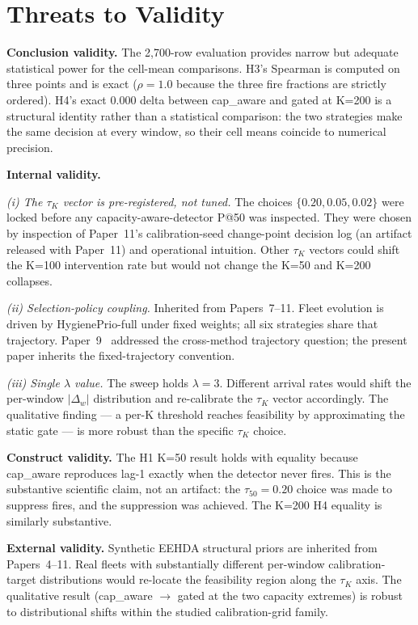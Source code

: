 \section{Threats to Validity}
\label{sec:threats}

\textbf{Conclusion validity.} The 2{,}700-row evaluation provides
narrow but adequate statistical power for the cell-mean comparisons.
H3's Spearman is computed on three points and is exact ($\rho = 1.0$
because the three fire fractions are strictly ordered). H4's exact
$0.000$ delta between cap\_aware and gated at K=200 is a structural
identity rather than a statistical comparison: the two strategies
make the same decision at every window, so their cell means coincide
to numerical precision.

\textbf{Internal validity.}

\textit{(i) The $\tau_K$ vector is pre-registered, not tuned.} The
choices $\{0.20, 0.05, 0.02\}$ were locked before any
capacity-aware-detector P@50 was inspected. They were chosen by
inspection of Paper~11's calibration-seed change-point decision log
(an artifact released with Paper~11) and operational intuition.
Other $\tau_K$ vectors could shift the K=100 intervention rate but
would not change the K=50 and K=200 collapses.

\textit{(ii) Selection-policy coupling.} Inherited from Papers~7--11.
Fleet evolution is driven by HygienePrio-full under fixed weights;
all six strategies share that trajectory. Paper~9~\cite{paper9selftraj}
addressed the cross-method trajectory question; the present paper
inherits the fixed-trajectory convention.

\textit{(iii) Single $\lambda$ value.} The sweep holds $\lambda = 3$.
Different arrival rates would shift the per-window $|\Delta_w|$
distribution and re-calibrate the $\tau_K$ vector accordingly. The
qualitative finding --- a per-K threshold reaches feasibility by
approximating the static gate --- is more robust than the specific
$\tau_K$ choice.

\textbf{Construct validity.} The H1 K=50 result holds with equality
because cap\_aware reproduces lag-1 exactly when the detector never
fires. This is the substantive scientific claim, not an artifact: the
$\tau_{50} = 0.20$ choice was made to suppress fires, and the
suppression was achieved. The K=200 H4 equality is similarly substantive.

\textbf{External validity.} Synthetic EEHDA structural priors are
inherited from Papers~4--11. Real fleets with substantially different
per-window calibration-target distributions would re-locate the
feasibility region along the $\tau_K$ axis. The qualitative result
(cap\_aware $\to$ gated at the two capacity extremes) is robust to
distributional shifts within the studied calibration-grid family.
